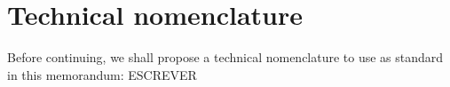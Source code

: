 \section{Technical nomenclature}
Before continuing, we shall propose a technical nomenclature to use as standard in this memorandum: ESCREVER
